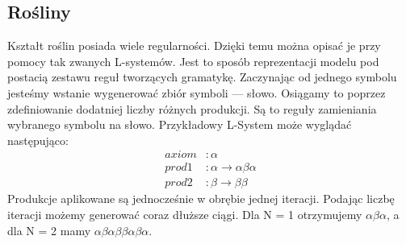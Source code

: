 \documentclass[inz,longabstract]{iithesis}
\begin{document}
        \subsection{Rośliny}
            Kształt roślin posiada wiele regularności. Dzięki temu można opisać je przy pomocy tak zwanych L-systemów. Jest to sposób reprezentacji modelu pod postacią zestawu reguł tworzących gramatykę. Zaczynając od jednego symbolu jesteśmy wstanie wygenerować zbiór symboli --- słowo. Osiągamy to poprzez zdefiniowanie dodatniej liczby różnych produkcji. Są to reguły zamieniania wybranego symbolu na słowo. Przykładowy L-System może wyglądać następująco:
            \begin{align*}
                axiom &: \alpha \\
                prod1 &: \alpha \rightarrow \alpha\beta\alpha \\
                prod2 &: \beta \rightarrow \beta\beta
            \end{align*}
            Produkcje aplikowane są jednocześnie w obrębie jednej iteracji. Podając liczbę iteracji możemy generować coraz dłuższe ciągi. Dla N = 1 otrzymujemy $\alpha\beta\alpha$, a dla N = 2 mamy $\alpha\beta\alpha\beta\beta\alpha\beta\alpha$.
            
\end{document}
